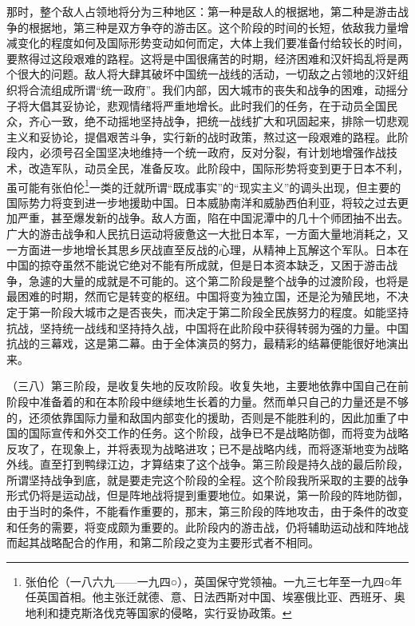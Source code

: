 \documentclass[UTF8, 12pt, a4paper]{ctexrep}
\begin{document}
那时，整个敌人占领地将分为三种地区：第一种是敌人的根据地，第二种是游击战争的根据地，第三种是双方争夺的游击区。这个阶段的时间的长短，依敌我力量增减变化的程度如何及国际形势变动如何而定，大体上我们要准备付给较长的时间，要熬得过这段艰难的路程。这将是中国很痛苦的时期，经济困难和汉奸捣乱将是两个很大的问题。敌人将大肆其破坏中国统一战线的活动，一切敌之占领地的汉奸组织将合流组成所谓“统一政府”。我们内部，因大城市的丧失和战争的困难，动摇分子将大倡其妥协论，悲观情绪将严重地增长。此时我们的任务，在于动员全国民众，齐心一致，绝不动摇地坚持战争，把统一战线扩大和巩固起来，排除一切悲观主义和妥协论，提倡艰苦斗争，实行新的战时政策，熬过这一段艰难的路程。此阶段内，必须号召全国坚决地维持一个统一政府，反对分裂，有计划地增强作战技术，改造军队，动员全民，准备反攻。此阶段中，国际形势将变到更于日本不利，虽可能有张伯伦\footnote{张伯伦（一八六九——一九四○），英国保守党领袖。一九三七年至一九四○年任英国首相。他主张迁就德、意、日法西斯对中国、埃塞俄比亚、西班牙、奥地利和捷克斯洛伐克等国家的侵略，实行妥协政策。}一类的迁就所谓“既成事实”的“现实主义”的调头出现，但主要的国际势力将变到进一步地援助中国。日本威胁南洋和威胁西伯利亚，将较之过去更加严重，甚至爆发新的战争。敌人方面，陷在中国泥潭中的几十个师团抽不出去。广大的游击战争和人民抗日运动将疲惫这一大批日本军，一方面大量地消耗之，又一方面进一步地增长其思乡厌战直至反战的心理，从精神上瓦解这个军队。日本在中国的掠夺虽然不能说它绝对不能有所成就，但是日本资本缺乏，又困于游击战争，急遽的大量的成就是不可能的。这个第二阶段是整个战争的过渡阶段，也将是最困难的时期，然而它是转变的枢纽。中国将变为独立国，还是沦为殖民地，不决定于第一阶段大城市之是否丧失，而决定于第二阶段全民族努力的程度。如能坚持抗战，坚持统一战线和坚持持久战，中国将在此阶段中获得转弱为强的力量。中国抗战的三幕戏，这是第二幕。由于全体演员的努力，最精彩的结幕便能很好地演出来。

（三八）第三阶段，是收复失地的反攻阶段。收复失地，主要地依靠中国自己在前阶段中准备着的和在本阶段中继续地生长着的力量。然而单只自己的力量还是不够的，还须依靠国际力量和敌国内部变化的援助，否则是不能胜利的，因此加重了中国的国际宣传和外交工作的任务。这个阶段，战争已不是战略防御，而将变为战略反攻了，在现象上，并将表现为战略进攻；已不是战略内线，而将逐渐地变为战略外线。直至打到鸭绿江边，才算结束了这个战争。第三阶段是持久战的最后阶段，所谓坚持战争到底，就是要走完这个阶段的全程。这个阶段我所采取的主要的战争形式仍将是运动战，但是阵地战将提到重要地位。如果说，第一阶段的阵地防御，由于当时的条件，不能看作重要的，那末，第三阶段的阵地攻击，由于条件的改变和任务的需要，将变成颇为重要的。此阶段内的游击战，仍将辅助运动战和阵地战而起其战略配合的作用，和第二阶段之变为主要形式者不相同。
\end{document}
